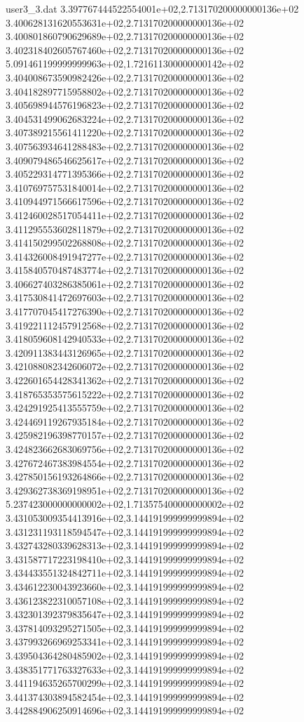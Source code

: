 \begin{filecontents}{user3_3.dat}
3.397767444522554001e+02,2.713170200000000136e+02
3.400628131620553631e+02,2.713170200000000136e+02
3.400801860790629689e+02,2.713170200000000136e+02
3.402318402605767460e+02,2.713170200000000136e+02
5.091461199999999963e+02,1.721611300000000142e+02
3.404008673590982426e+02,2.713170200000000136e+02
3.404182897715958802e+02,2.713170200000000136e+02
3.405698944576196823e+02,2.713170200000000136e+02
3.404531499062683224e+02,2.713170200000000136e+02
3.407389215561411220e+02,2.713170200000000136e+02
3.407563934641288483e+02,2.713170200000000136e+02
3.409079486546625617e+02,2.713170200000000136e+02
3.405229314771395366e+02,2.713170200000000136e+02
3.410769757531840014e+02,2.713170200000000136e+02
3.410944971566617596e+02,2.713170200000000136e+02
3.412460028517054411e+02,2.713170200000000136e+02
3.411295553602811879e+02,2.713170200000000136e+02
3.414150299502268808e+02,2.713170200000000136e+02
3.414326008491947277e+02,2.713170200000000136e+02
3.415840570487483774e+02,2.713170200000000136e+02
3.406627403286385061e+02,2.713170200000000136e+02
3.417530841472697603e+02,2.713170200000000136e+02
3.417707045417276390e+02,2.713170200000000136e+02
3.419221112457912568e+02,2.713170200000000136e+02
3.418059608142940533e+02,2.713170200000000136e+02
3.420911383443126965e+02,2.713170200000000136e+02
3.421088082342606072e+02,2.713170200000000136e+02
3.422601654428341362e+02,2.713170200000000136e+02
3.418765353575615222e+02,2.713170200000000136e+02
3.424291925413555759e+02,2.713170200000000136e+02
3.424469119267935184e+02,2.713170200000000136e+02
3.425982196398770157e+02,2.713170200000000136e+02
3.424823662683069756e+02,2.713170200000000136e+02
3.427672467383984554e+02,2.713170200000000136e+02
3.427850156193264866e+02,2.713170200000000136e+02
3.429362738369198951e+02,2.713170200000000136e+02
5.237423000000000002e+02,1.713575400000000002e+02
3.431053009354413916e+02,3.144191999999999894e+02
3.431231193118594547e+02,3.144191999999999894e+02
3.432743280339628313e+02,3.144191999999999894e+02
3.431587717223198410e+02,3.144191999999999894e+02
3.434433551324842711e+02,3.144191999999999894e+02
3.434612230043923660e+02,3.144191999999999894e+02
3.436123822310057108e+02,3.144191999999999894e+02
3.432301392379835647e+02,3.144191999999999894e+02
3.437814093295271505e+02,3.144191999999999894e+02
3.437993266969253341e+02,3.144191999999999894e+02
3.439504364280485902e+02,3.144191999999999894e+02
3.438351771763327633e+02,3.144191999999999894e+02
3.441194635265700299e+02,3.144191999999999894e+02
3.441374303894582454e+02,3.144191999999999894e+02
3.442884906250914696e+02,3.144191999999999894e+02

\end{filecontents}
